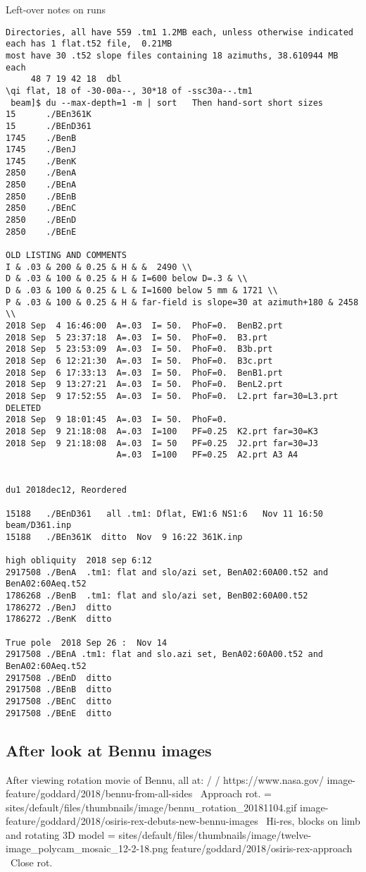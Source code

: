 \documentclass{article}
\begin{document}
 
Left-over notes on runs
\vspace{-3.mm} 
\begin{verbatim}
Directories, all have 559 .tm1 1.2MB each, unless otherwise indicated 
each has 1 flat.t52 file,  0.21MB
most have 30 .t52 slope files containing 18 azimuths, 38.610944 MB each 
     48 7 19 42 18  dbl
\qi flat, 18 of -30-00a--, 30*18 of -ssc30a--.tm1
 beam]$ du --max-depth=1 -m | sort   Then hand-sort short sizes 
15      ./BEn361K
15      ./BEnD361
1745    ./BenB
1745    ./BenJ
1745    ./BenK
2850    ./BenA
2850    ./BEnA
2850    ./BEnB
2850    ./BEnC
2850    ./BEnD
2850    ./BEnE

OLD LISTING AND COMMENTS
I & .03 & 200 & 0.25 & H & &  2490 \\ 
D & .03 & 100 & 0.25 & H & I=600 below D=.3 & \\
D & .03 & 100 & 0.25 & L & I=1600 below 5 mm & 1721 \\
P & .03 & 100 & 0.25 & H & far-field is slope=30 at azimuth+180 & 2458 \\ 
2018 Sep  4 16:46:00  A=.03  I= 50.  PhoF=0.  BenB2.prt
2018 Sep  5 23:37:18  A=.03  I= 50.  PhoF=0.  B3.prt
2018 Sep  5 23:53:09  A=.03  I= 50.  PhoF=0.  B3b.prt
2018 Sep  6 12:21:30  A=.03  I= 50.  PhoF=0.  B3c.prt
2018 Sep  6 17:33:13  A=.03  I= 50.  PhoF=0.  BenB1.prt
2018 Sep  9 13:27:21  A=.03  I= 50.  PhoF=0.  BenL2.prt
2018 Sep  9 17:52:55  A=.03  I= 50.  PhoF=0.  L2.prt far=30=L3.prt DELETED    
2018 Sep  9 18:01:45  A=.03  I= 50.  PhoF=0. 
2018 Sep  9 21:18:08  A=.03  I=100   PF=0.25  K2.prt far=30=K3
2018 Sep  9 21:18:08  A=.03  I= 50   PF=0.25  J2.prt far=30=J3
                      A=.03  I=100   PF=0.25  A2.prt A3 A4


du1 2018dec12, Reordered

15188   ./BEnD361   all .tm1: Dflat, EW1:6 NS1:6   Nov 11 16:50 beam/D361.inp
15188   ./BEn361K  ditto  Nov  9 16:22 361K.inp

high obliquity  2018 sep 6:12
2917508 ./BenA  .tm1: flat and slo/azi set, BenA02:60A00.t52 and BenA02:60Aeq.t52
1786268 ./BenB  .tm1: flat and slo/azi set, BenB02:60A00.t52
1786272 ./BenJ  ditto
1786272 ./BenK  ditto

True pole  2018 Sep 26 :  Nov 14
2917508 ./BEnA .tm1: flat and slo.azi set, BenA02:60A00.t52 and BenA02:60Aeq.t52
2917508 ./BEnD  ditto
2917508 ./BEnB  ditto
2917508 ./BEnC  ditto
2917508 ./BEnE  ditto
\end{verbatim}   

\subsection{After look at Bennu images} %
After viewing rotation movie of Bennu, all at: / / https://www.nasa.gov/
\qi image-feature/goddard/2018/bennu-from-all-sides \  Approach rot.
\qii = sites/default/files/thumbnails/image/bennu_rotation_20181104.gif
\qi image-feature/goddard/2018/osiris-rex-debuts-new-bennu-images \ Hi-res, blocks on limb
\qiii and rotating 3D model
\qii = sites/default/files/thumbnails/image/twelve-image_polycam_mosaic_12-2-18.png
\qi feature/goddard/2018/osiris-rex-approach  \   Close rot.  
\end{document}

